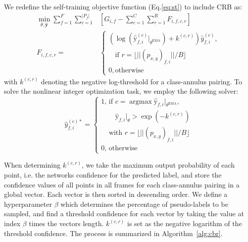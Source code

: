 \documentclass[10pt,twocolumn,letterpaper]{article}
\DeclareMathOperator*{\argmax}{argmax}
\newcommand{\floor}[1]{\lfloor #1 \rfloor}
\begin{document}
We redefine the self-training objective function (Eq.\ref{eq:st}) to include CRB as:
\begin{equation} \label{eq:crb}
\begin{split}
  \min_{\theta, \hat{\bm{y}}}
    \sum_{f=1}^{F}\sum_{i=1}^{|P_f|}
    & \left[
        G_{i,f} - \sum_{c=1}^C \sum_{r=1}^R F_{i,f,c,r}
    \right] \\
    F_{i,f,c,r} = &
    \begin{cases}
        (\log(\hat{\mathrm{y}}_{f,i}^{(c )}|_{\theta^\textrm{EMA}}) +  k^{(c,r)}) \hat{y}_{f,i}^{(c)}, \\
        \phantom{0, } \textrm{if } {r = \floor{||(p_{x,y})_{f,i}||/B}} \\
        0, \textrm{otherwise}
    \end{cases}
\end{split}
\end{equation}
with $k^{(c,r)}$ denoting the negative log-threshold for a class-annulus pairing. To solve the nonlinear integer optimization task, we employ the following solver:
\begin{equation} \label{eq:crb_solver}
    \hat{y}_{f,i}^{(c)*} = 
    \begin{cases}
    1\textrm{, if } c = \argmax  \hat{\mathrm{y}}_{f,i}|_{\theta^\textrm{EMA}}, \\
    \phantom{1\textrm{, if }} \hat{\mathrm{y}}_{f,i}|_\theta > \exp(-k^{(c,r)}) \\
    \phantom{1\textrm{, }} \textrm{with } r = \floor{||(p_{x,y})_{f,i}||/B} \\
    0\textrm{, otherwise}
    \end{cases}
\end{equation}

When determining $k^{(c,r)}$, we take the maximum output probability of each point, i.e. the networks confidence for the predicted label, and store the confidence values of all points in all frames for each class-annulus pairing in a global vector. Each vector is then sorted in descending order. We define a hyperparameter $\beta$ which determines the percentage of pseudo-labels to be sampled, and find a threshold confidence for each vector by taking the value at index $\beta$ times the vectors length. $k^{(c,r)}$ is set as the negative logarithm of the threshold confidence. The process is summarized in Algorithm~\ref{alg:cbr}.
\end{document}

